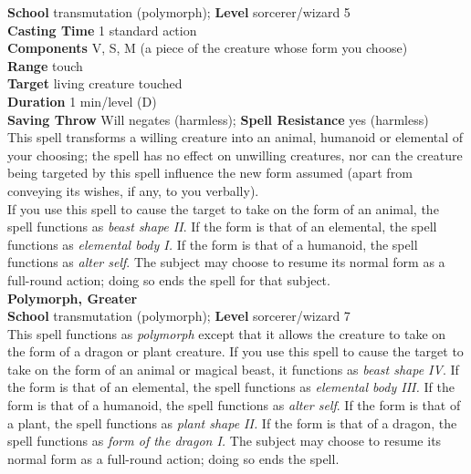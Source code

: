 \textbf{School }transmutation (polymorph); \textbf{Level }sorcerer/wizard 5\\
\textbf{Casting Time }1 standard action\\
\textbf{Components }V, S, M (a piece of the creature whose form you choose)\\
\textbf{Range }touch\\
\textbf{Target }living creature touched\\
\textbf{Duration }1 min/level (D)\\
\textbf{Saving Throw }Will negates (harmless); \textbf{Spell Resistance }yes (harmless)\\
This spell transforms a willing creature into an animal, humanoid or elemental of your choosing; the spell has no effect on unwilling creatures, nor can the creature being targeted by this spell influence the new form assumed (apart from conveying its wishes, if any, to you verbally).\\
If you use this spell to cause the target to take on the form of an animal, the spell functions as \textit{beast shape II}. If the form is that of an elemental, the spell functions as \textit{elemental body I. }If the form is that of a humanoid, the spell functions as \textit{alter self}. The subject may choose to resume its normal form as a full-round action; doing so ends the spell for that subject.\\
\textbf{Polymorph, Greater}\\
\textbf{School }transmutation (polymorph); \textbf{Level }sorcerer/wizard 7\\
This spell functions as \textit{polymorph} except that it allows the creature to take on the form of a dragon or plant creature. If you use this spell to cause the target to take on the form of an animal or magical beast, it functions as \textit{beast shape IV}. If the form is that of an elemental, the spell functions as \textit{elemental body III. }If the form is that of a humanoid, the spell functions as \textit{alter self}. If the form is that of a plant, the spell functions as \textit{plant shape II. }If the form is that of a dragon, the spell functions as \textit{form of the dragon I. }The subject may choose to resume its normal form as a full-round action; doing so ends the spell.\\
